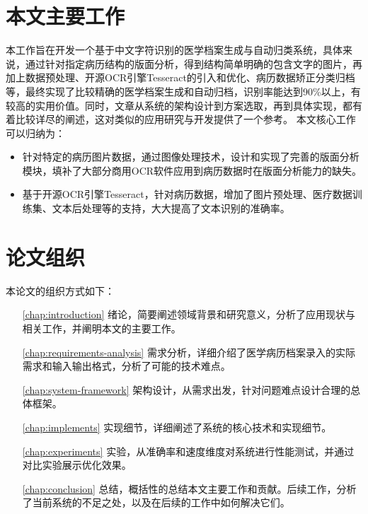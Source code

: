 \section{本文主要工作}
本工作旨在开发一个基于中文字符识别的医学档案生成与自动归类系统，具体来说，通过针对指定病历结构的版面分析，得到结构简单明确的包含文字的图片，再加上数据预处理、开源OCR引擎Tesseract的引入和优化、病历数据矫正分类归档等，最终实现了比较精确的医学档案生成和自动归档，识别率能达到90\%以上，有较高的实用价值。同时，文章从系统的架构设计到方案选取，再到具体实现，都有着比较详尽的阐述，这对类似的应用研究与开发提供了一个参考。
本文核心工作可以归纳为：
\begin{itemize}
  \item 针对特定的病历图片数据，通过图像处理技术，设计和实现了完善的版面分析模块，填补了大部分商用OCR软件应用到病历数据时在版面分析能力的缺失。
  \item 基于开源OCR引擎Tesseract，针对病历数据，增加了图片预处理、医疗数据训练集、文本后处理等的支持，大大提高了文本识别的准确率。
\end{itemize}

\section{论文组织}
本论文的组织方式如下：
\begin{itemize}
	\item[\autoref{chap:introduction}]
	绪论，简要阐述领域背景和研究意义，分析了应用现状与相关工作，并阐明本文的主要工作。
	\item[\autoref{chap:requirements-analysis}] 需求分析，详细介绍了医学病历档案录入的实际需求和输入输出格式，分析了可能的技术难点。
	\item[\autoref{chap:system-framework}]
	架构设计，从需求出发，针对问题难点设计合理的总体框架。
	\item[\autoref{chap:implements}]
	实现细节，详细阐述了系统的核心技术和实现细节。
	\item[\autoref{chap:experiments}]
	实验，从准确率和速度维度对系统进行性能测试，并通过对比实验展示优化效果。
	\item[\autoref{chap:conclusion}]
	总结，概括性的总结本文主要工作和贡献。后续工作，分析了当前系统的不足之处，以及在后续的工作中如何解决它们。
\end{itemize}
